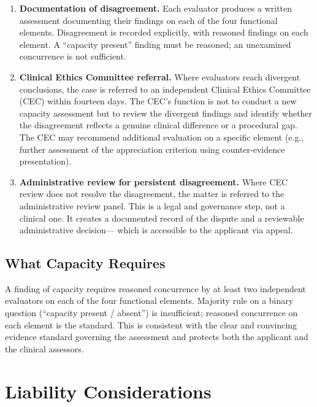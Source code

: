 \documentclass[11pt, letterpaper]{article}
\begin{document}
\begin{enumerate}
  \item \textbf{Documentation of disagreement.} Each evaluator produces a written
    assessment documenting their findings on each of the four functional elements.
    Disagreement is recorded explicitly, with reasoned findings on each element.
    A ``capacity present'' finding must be reasoned; an unexamined concurrence is not
    sufficient.

  \item \textbf{Clinical Ethics Committee referral.} Where evaluators reach divergent
    conclusions, the case is referred to an independent Clinical Ethics Committee (CEC)
    within fourteen days. The CEC's function is not to conduct a new capacity assessment
    but to review the divergent findings and identify whether the disagreement reflects
    a genuine clinical difference or a procedural gap. The CEC may recommend additional
    evaluation on a specific element (e.g., further assessment of the appreciation
    criterion using counter-evidence presentation).

  \item \textbf{Administrative review for persistent disagreement.} Where CEC review
    does not resolve the disagreement, the matter is referred to the administrative
    review panel. This is a legal and governance step, not a clinical one. It creates
    a documented record of the dispute and a reviewable administrative decision---
    which is accessible to the applicant via appeal.
\end{enumerate}

\subsection{What Capacity Requires}

A finding of capacity requires reasoned concurrence by at least two independent
evaluators on each of the four functional elements. Majority rule on a binary question
(``capacity present / absent'') is insufficient; reasoned concurrence on each element
is the standard. This is consistent with the clear and convincing evidence standard
governing the assessment and protects both the applicant and the clinical assessors.

\section{Liability Considerations}
\end{document}
